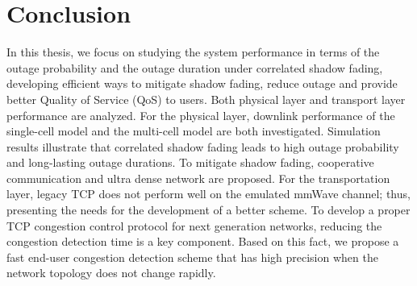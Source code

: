 \chapter{Conclusion}\label{ch:6}
 \par In this thesis, we focus on studying the system performance in terms of the outage probability and the outage duration under correlated shadow fading, developing efficient ways to mitigate shadow fading, reduce outage and provide better Quality of Service (QoS) to users. Both physical layer and transport layer performance are analyzed. For the physical layer, downlink performance of the single-cell model and the multi-cell model are both investigated. Simulation results illustrate that correlated shadow fading leads to high outage probability and long-lasting outage durations. To mitigate shadow fading, cooperative communication and ultra dense network are proposed. For the transportation layer, legacy TCP does not perform well on the emulated mmWave channel; thus, presenting the needs for the development of a better scheme. To develop a proper TCP congestion control protocol for next generation networks, reducing the congestion detection time is a key component. Based on this fact, we propose a fast end-user congestion detection scheme that has high precision when the network topology does not change rapidly.
